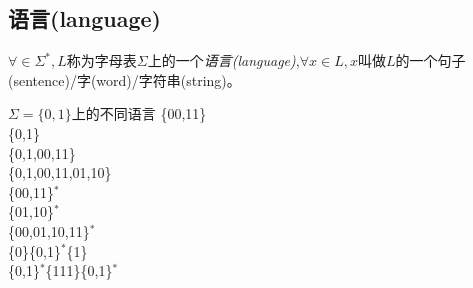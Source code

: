 \subsection{语言(language)}
$\forall \in\Sigma^{\ast},L$称为字母表$\Sigma$上的一个\emph{语言(language)},$\forall x\in L,x$叫做$L$的一个句子(sentence)/字(word)/字符串(string)。
\begin{example}
	$\Sigma = \{0,1\}$上的不同语言
	\{00,11\}\\
	\{0,1\}\\
	\{0,1,00,11\}\\
	\{0,1,00,11,01,10\}\\
	\{00,11\}$^{\ast}$\\
	\{01,10\}$^{\ast}$\\
	\{00,01,10,11\}$^{\ast}$\\
	\{0\}\{0,1\}$^{\ast}$\{1\}\\
	\{0,1\}$^{\ast}$\{111\}\{0,1\}$^{\ast}$\\
\end{example}

